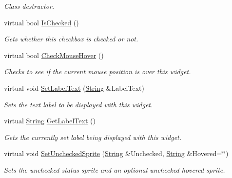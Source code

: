 \begin{DoxyCompactItemize}
\begin{DoxyCompactList}\small\item\em Class destructor. \item\end{DoxyCompactList}\item 
virtual bool \hyperlink{classphys_1_1UI_1_1CheckBox_acf01a9b19251212fb626d022d02b53d5}{IsChecked} ()
\begin{DoxyCompactList}\small\item\em Gets whether this checkbox is checked or not. \item\end{DoxyCompactList}\item 
virtual bool \hyperlink{classphys_1_1UI_1_1CheckBox_a3c9b10c692dfb62dedbd091dac12c115}{CheckMouseHover} ()
\begin{DoxyCompactList}\small\item\em Checks to see if the current mouse position is over this widget. \item\end{DoxyCompactList}\item 
virtual void \hyperlink{classphys_1_1UI_1_1CheckBox_aa25bc0f39dca43c00585d107e9a3bcb7}{SetLabelText} (\hyperlink{namespacephys_aa03900411993de7fbfec4789bc1d392e}{String} \&LabelText)
\begin{DoxyCompactList}\small\item\em Sets the text label to be displayed with this widget. \item\end{DoxyCompactList}\item 
virtual \hyperlink{namespacephys_aa03900411993de7fbfec4789bc1d392e}{String} \hyperlink{classphys_1_1UI_1_1CheckBox_a19078efa52e8b2c133f3b5229b8742eb}{GetLabelText} ()
\begin{DoxyCompactList}\small\item\em Gets the currently set label being displayed with this widget. \item\end{DoxyCompactList}\item 
virtual void \hyperlink{classphys_1_1UI_1_1CheckBox_a8faf96913bf562238e3a50aa420a457d}{SetUncheckedSprite} (\hyperlink{namespacephys_aa03900411993de7fbfec4789bc1d392e}{String} \&Unchecked, \hyperlink{namespacephys_aa03900411993de7fbfec4789bc1d392e}{String} \&Hovered=\char`\"{}\char`\"{})
\begin{DoxyCompactList}\small\item\em Sets the unchecked status sprite and an optional unchecked hovered sprite. \item\end{DoxyCompactList}\item 

\end{DoxyCompactItemize}

